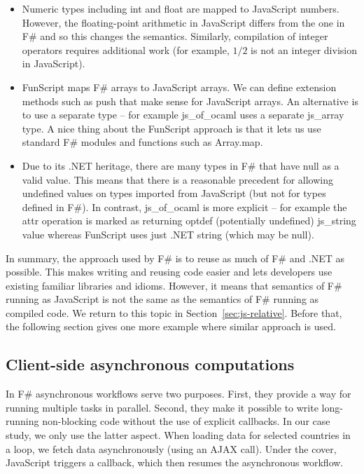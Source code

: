 \documentclass[submission,copyright,creativecommons]{eptcs}
\newcommand{\kvd}[1]{\textnormal{\textcolor{kvdclr}{\sffamily #1}}}
\newcommand{\ident}[1]{\textnormal{\sffamily #1}}
\begin{document}
\begin{itemize}
\item Numeric types including \ident{int} and \ident{float} are mapped to JavaScript numbers.
  However, the floating-point arithmetic in JavaScript differs from the one in F\# and so this changes 
  the semantics. Similarly, compilation of integer operators requires additional work (for 
  example, $1/2$ is not an integer division in JavaScript).

\item FunScript maps F\# arrays to JavaScript arrays. We can define extension methods
  such as \ident{push} that make sense for JavaScript arrays. An alternative is to use a 
  separate type -- for example js\_of\_ocaml uses a separate \ident{js\_array} type.
  A nice thing about the FunScript approach is that it lets us use standard F\# modules
  and functions such as \ident{Array.map}.

\item Due to its .NET heritage, there are many types in F\# that have \kvd{null} as a valid
  value. This means that there is a reasonable precedent for allowing \kvd{undefined} values
  on types imported from JavaScript (but not for types defined in F\#). In contrast,
  js\_of\_ocaml is more explicit -- for example the \ident{attr} operation is marked as 
  returning \ident{optdef} (potentially undefined) \ident{js\_string} value whereas FunScript
  uses just .NET \ident{string} (which may be \kvd{null}).
\end{itemize}

\noindent
In summary, the approach used by F\# is to reuse as much of F\# and .NET as possible. This
makes writing and reusing code easier and lets developers use existing familiar libraries and
idioms. However, it means that semantics of F\# running as JavaScript is not the same as the
semantics of F\# running as compiled code. We return to this topic in Section~\ref{sec:js-relative}. 
Before that, the following section gives one more example where similar approach is used.

\subsection{Client-side asynchronous computations}
\label{sec:js-async}

In F\# asynchronous workflows \cite{fsharp-async} serve two purposes. First, they provide a
way for running multiple tasks in parallel. Second, they make it possible to write long-running
non-blocking code without the use of explicit callbacks. In our case study, we only use the 
latter aspect. When loading data for selected countries in a loop, we fetch data asynchronously 
(using an AJAX call). Under the cover, JavaScript triggers a callback, which then resumes the 
asynchronous workflow. 
\end{document}
